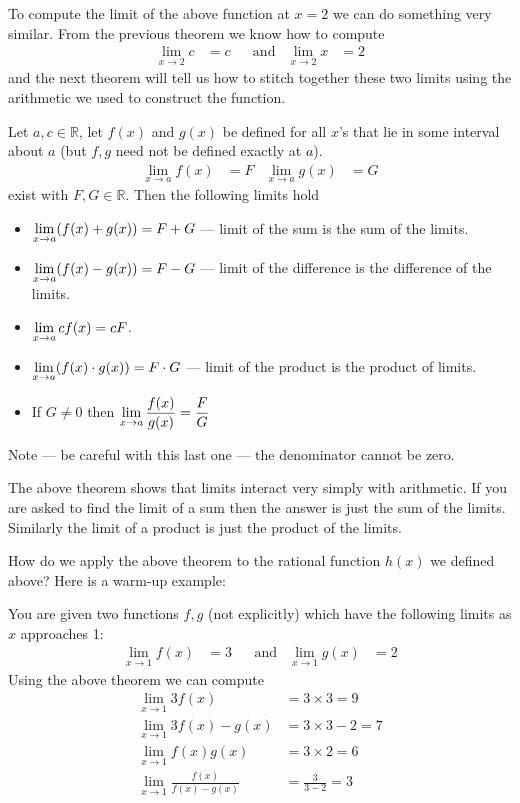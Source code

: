 To compute the limit of the above function at $x=2$ we can do something very
similar. From the previous theorem we know how to compute
\begin{align*}
  \lim_{x \to 2} c &= c && \text{and} & \lim_{x \to 2} x &= 2
\end{align*}
and the next theorem will tell us how to stitch together these two limits using
the arithmetic we used to construct the function.

\begin{theorem}\label{thm arith lim}
  Let $a,c \in \mathbb{R}$, let $f(x)$ and $g(x)$ be defined for all $x$'s that lie in
some interval about $a$ (but $f,g$ need not be defined exactly at $a$).
 \begin{align*}
  \lim_{x \to a} f(x)&=F & \lim_{x \to a} g(x) &=G
\end{align*}
  exist with $F,G \in \mathbb{R}$. Then the following limits hold
\begin{itemize}
 \item $\displaystyle \lim_{x \to a} ( f(x) + g(x) ) = F+G$ --- limit of the sum is the
sum of the limits.
 \item $\displaystyle \lim_{x \to a} ( f(x) - g(x) ) = F - G$ --- limit of the difference
is the difference of the limits.
\item $\displaystyle \lim_{x \to a} c f(x) = c F$.
\item $\displaystyle \lim_{x \to a} ( f(x) \cdot g(x) ) = F \cdot G$ --- limit of
the product is the product of limits.
\item If $G \neq 0$ then $\displaystyle \lim_{x \to a} \frac{f(x)}{g(x)} = \frac{F}{G}$
\end{itemize}
Note --- be careful with this last one --- the denominator cannot be zero.
\end{theorem}
The above theorem shows that limits interact very simply with arithmetic. If
you are asked to find the limit of a sum then the answer is just the sum of the
limits. Similarly the limit of a product is just the product of the limits.


How do we apply the above theorem to the rational function $h(x)$ we defined
above? Here is a warm-up example:
\begin{eg}
You are given two functions $f,g$ (not explicitly) which have the following
limits as $x$ approaches 1:
\begin{align*}
  \lim_{x \to 1} f(x)&=3 && \text{and} & \lim_{x\to 1} g(x)&=2
\end{align*}
Using the above theorem we can compute
\begin{align*}
 \lim_{x \to 1} 3f(x) &= 3 \times 3 = 9 \\
 \lim_{x \to 1} 3f(x) -g(x) &= 3\times 3 -2 = 7\\
 \lim_{x \to 1} f(x) g(x) &= 3\times 2 = 6\\
 \lim_{x \to 1} \frac{f(x)}{f(x) -g(x)} &= \frac{3}{3-2} = 3
\end{align*}
\end{eg}

